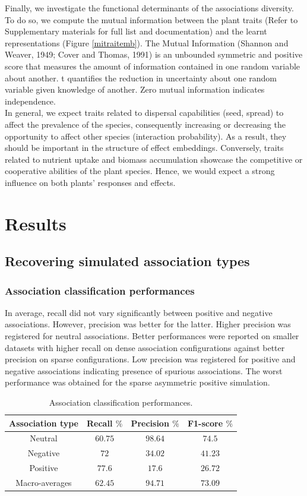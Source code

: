 \documentclass[]{article}
\begin{document}
\noindent Finally, we investigate the functional determinants of the associations diversity. To do so, we compute the mutual information between the plant traits (Refer to Supplementary materials for full list and documentation) and the learnt representations (Figure \ref{mitraitemb}). The Mutual Information (Shannon and Weaver, 1949; Cover and Thomas, 1991) is an unbounded symmetric and positive score that  measures the amount of information contained in one random variable about another. t quantifies the reduction in uncertainty about one random variable given knowledge of another. Zero mutual information indicates independence. \\

\noindent In general, we expect traits related to dispersal capabilities (seed, spread) to affect the prevalence of the species, consequently increasing or decreasing the opportunity to affect other species (interaction probability). As a result, they should be important in the structure of effect embeddings. Conversely, traits related to nutrient uptake and biomass accumulation showcase the competitive or cooperative abilities of the plant species. Hence, we would expect a strong influence on both plants' responses and effects.   

\section{Results}
\subsection{Recovering simulated association types}
\subsubsection{Association classification performances}
In average, recall did not vary significantly between positive and negative associations. However, precision was better for the latter. Higher precision was registered for neutral associations. Better performances were reported on smaller datasets with higher recall  on dense association configurations against better precision on sparse configurations. Low precision was registered for positive and negative associations indicating presence of spurious associations. The worst performance was obtained for the sparse asymmetric positive simulation.  

\begin{table}[H]
\centering
\begin{tabular}{|c|c|c|c|}
	\hline 
	\textbf{Association type} & \textbf{Recall $\%$} & \textbf{Precision $\%$} & \textbf{F1-score $\%$} \\ 
	\hline 
	Neutral & $60.75$ & $98.64$ & $74.5$ \\ 
	\hline 
	Negative & $72 $ & $34.02$ & $41.23$ \\ 
	\hline 
	Positive & $77.6$ & $17.6$ & $26.72$ \\ 
	\hline 
	Macro-averages & $62.45$ & $94.71$ & $73.09$ \\ 
	\hline 
\end{tabular} 
\caption{Association classification performances.}\label{classmet}
\end{table}
\end{document}
